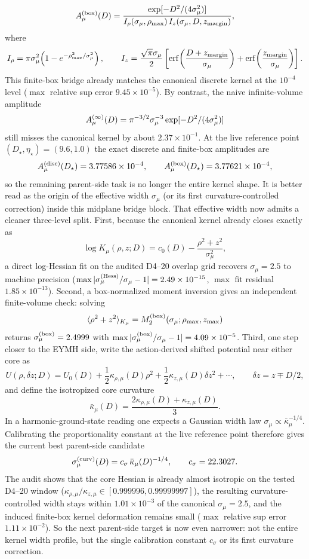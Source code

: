 \documentclass[aps,prd,onecolumn,notitlepage,nofootinbib,superscriptaddress,11pt,floatfix]{revtex4-2}
\begin{document}
\[
A_\mu^{\rm(box)}(D)
=
\frac{\exp[-D^2/(4\sigma_\mu^2)]}
{I_\rho(\sigma_\mu,\rho_{\max})\,I_z(\sigma_\mu,D,z_{\rm margin})},
\]
where
\[
I_\rho=\pi\sigma_\mu^2\!\left(1-e^{-\rho_{\max}^2/\sigma_\mu^2}\right),
\qquad
I_z=\frac{\sqrt{\pi}\sigma_\mu}{2}
\left[
\operatorname{erf}\!\left(\frac{D+z_{\rm margin}}{\sigma_\mu}\right)
+
\operatorname{erf}\!\left(\frac{z_{\rm margin}}{\sigma_\mu}\right)
\right].
\]
This finite-box bridge already matches the canonical discrete kernel at the $10^{-4}$ level ($\max$ relative sup error $9.45\times10^{-5}$). By contrast, the naive infinite-volume amplitude
\[
A_\mu^{\rm(\infty)}(D)=\pi^{-3/2}\sigma_\mu^{-3}\exp[-D^2/(4\sigma_\mu^2)]
\]
still misses the canonical kernel by about $2.37\times10^{-1}$. At the live reference point $(D_\star,\eta_\star)=(9.6,1.0)$ the exact discrete and finite-box amplitudes are
\[
A_\mu^{\rm(disc)}(D_\star)=3.77586\times10^{-4},
\qquad
A_\mu^{\rm(box)}(D_\star)=3.77621\times10^{-4},
\]
so the remaining parent-side task is no longer the entire kernel shape. It is better read as the origin of the effective width $\sigma_\mu$ (or its first curvature-controlled correction) inside this midplane bridge block.
That effective width now admits a cleaner three-level split. First, because the canonical kernel already closes exactly as
\[
\log K_\mu(\rho,z;D)=c_0(D)-\frac{\rho^2+z^2}{\sigma_\mu^2},
\]
a direct log-Hessian fit on the audited D4--20 overlap grid recovers $\sigma_\mu=2.5$ to machine precision ($\max |\sigma_\mu^{\rm(Hess)}/\sigma_\mu-1|=2.49\times10^{-15}$, $\max$ fit residual $1.85\times10^{-13}$). Second, a box-normalized moment inversion gives an independent finite-volume check: solving
\[
\langle \rho^2+z^2\rangle_{K_\mu}=M_2^{\rm(box)}(\sigma_\mu;\rho_{\max},z_{\max})
\]
returns $\sigma_\mu^{\rm(box)}=2.4999$ with $\max |\sigma_\mu^{\rm(box)}/\sigma_\mu-1|=4.09\times10^{-5}$. Third, one step closer to the EYMH side, write the action-derived shifted potential near either core as
\[
U(\rho,\delta z;D)
=
U_0(D)+\frac12\kappa_{\rho,\mu}(D)\rho^2+\frac12\kappa_{z,\mu}(D)\delta z^2+\cdots,
\qquad
\delta z=z\mp D/2,
\]
and define the isotropized core curvature
\[
\bar\kappa_\mu(D)=\frac{2\kappa_{\rho,\mu}(D)+\kappa_{z,\mu}(D)}{3}.
\]
In a harmonic-ground-state reading one expects a Gaussian width law $\sigma_\mu\propto \bar\kappa_\mu^{-1/4}$. Calibrating the proportionality constant at the live reference point therefore gives the current best parent-side candidate
\[
\sigma_\mu^{\rm(curv)}(D)=c_\sigma\,\bar\kappa_\mu(D)^{-1/4},
\qquad
c_\sigma=22.3027.
\]
The audit  shows that the core Hessian is already almost isotropic on the tested D4--20 window ($\kappa_{\rho,\mu}/\kappa_{z,\mu}\in[0.999996,0.99999997]$), the resulting curvature-controlled width stays within $1.01\times10^{-3}$ of the canonical $\sigma_\mu=2.5$, and the induced finite-box kernel deformation remains small ($\max$ relative sup error $1.11\times10^{-2}$). So the next parent-side target is now even narrower: not the entire kernel width profile, but the single calibration constant $c_\sigma$ or its first curvature correction.
\end{document}
